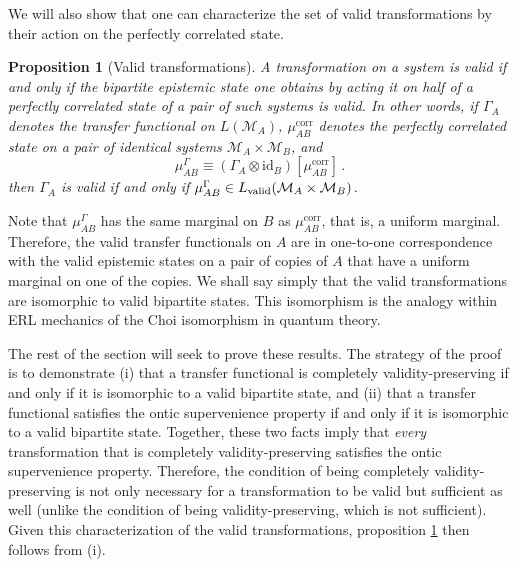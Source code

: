 \documentclass[pra,superscriptaddress,nofootinbib,12pt]{revtex4-2}
\newtheorem{proposition}[theorem]{Proposition}
\begin{document}
We will also show that one can characterize the set of valid transformations by their action on the perfectly correlated state.
\begin{proposition}[Valid transformations]\label{lem:validtransfer}\label{thm:validtransferfunctions}
A transformation on a system is valid if and only if the bipartite epistemic state one obtains by acting
it on half of a perfectly correlated state of a pair of such systems is valid.  In other words, if $\Gamma_A$ denotes the transfer functional on $L(\mathcal{M}_A)$, $\mu^{\mathrm{corr}}_{AB}$ denotes the perfectly correlated state on a pair of identical systems $\mathcal{M}_A \times \mathcal{M}_B$, and
\begin{equation}
  \label{eq:CJisomorphism}
  \mu_{AB}^{\Gamma }\equiv (\Gamma_{A}\otimes \textrm{id}_B)[\mu_{AB}^{\mathrm{corr}}]\,.
\end{equation}
then $\Gamma_A$ is valid if and only if $\mu_{AB}^{\Gamma }\in L_{\rm valid}(\mathcal{M}_A \times \mathcal{M}_B)$.
\end{proposition}
Note that $\mu_{AB}^{\Gamma }$ has the same marginal on $B$ as $\mu_{AB}^{\mathrm{corr}}$, that is, a uniform marginal.  Therefore, the valid transfer functionals on $A$ are in one-to-one correspondence with the valid epistemic states on a pair of copies of $A$ that have a uniform marginal on one of the copies.  We shall say simply that the valid transformations are isomorphic to valid bipartite states. This isomorphism is the analogy within ERL mechanics of the Choi isomorphism in quantum theory.

The rest of the section will seek to prove these results.  The strategy of the proof is to demonstrate (i) that a transfer functional is completely validity-preserving if and only if it is isomorphic to a valid bipartite state, and (ii) that a transfer functional satisfies the ontic supervenience property if and only if it is isomorphic to a valid bipartite state.  Together, these two facts imply that \emph{every} transformation that is completely validity-preserving satisfies the ontic supervenience property.  Therefore, the condition of being completely validity-preserving is not only necessary for a transformation to be valid but sufficient as well (unlike the condition of being validity-preserving, which is not sufficient). Given this characterization of the valid transformations, proposition \ref{lem:validtransfer} then follows from (i).


\end{document}
